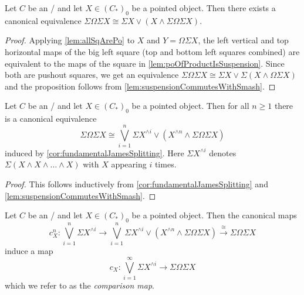 \begin{corollary}\label{cor:fundamentalJamesSplitting}
    Let $C$ be an \inftytop/ and let $X\in \left(C_*\right)_0$ be a pointed object. 
    Then there exists a canonical equivalence $\Sigma\Omega\Sigma X\cong\Sigma X\vee\left(X\wedge\Sigma\Omega\Sigma X\right)$.
    \begin{proof}
        Applying \cref{lem:allSqArePo} to $X$ and $Y=\Omega\Sigma X$, the left vertical and top horizontal maps of the big left square (top and bottom left squares combined) are equivalent to the maps of the square in \cref{lem:poOfProductIsSuspension}.
        Since both are pushout squares, we get an equivalence $\Sigma\Omega\Sigma X\cong\Sigma X\vee\Sigma\left(X\wedge\Omega\Sigma X\right)$ and the proposition follows from \cref{lem:suspensionCommutesWithSmash}.
    \end{proof}
\end{corollary}
\begin{corollary}
    Let $C$ be an \inftytop/ and let $X\in \left(C_*\right)_0$ be a pointed object. 
    Then for all $n\geq 1$ there is a canonical equivalence
    \begin{equation*}
        \Sigma\Omega\Sigma X \cong\bigvee\limits_{i=1}^n\Sigma X^{\wedge i}\vee\left(X^{\wedge n}\wedge\Sigma\Omega\Sigma X\right)
    \end{equation*}
    induced by \cref{cor:fundamentalJamesSplitting}.
    Here $\Sigma X^{\wedge i}$ denotes $\Sigma\left(X\wedge X\wedge\ldots\wedge X\right)$ with $X$ appearing $i$ times.
    \begin{proof}
        This follows inductively from \cref{cor:fundamentalJamesSplitting} and \cref{lem:suspensionCommutesWithSmash}.
    \end{proof}
\end{corollary}
\begin{definition}
    Let $C$ be an \inftytop/ and let $X\in \left(C_*\right)_0$ be a pointed object. 
    Then the canonical maps 
    \begin{equation*}
        c_X^n\colon\bigvee\limits_{i=1}^n\Sigma X^{\wedge i}\to\bigvee\limits_{i=1}^n\Sigma X^{\wedge i}\vee\left(X^{\wedge n}\wedge\Sigma\Omega\Sigma X\right)\xrightarrow{\cong}\Sigma\Omega\Sigma X
    \end{equation*}
    induce a map
    \begin{equation*}
        c_X\colon\bigvee\limits_{i=1}^{\infty}\Sigma X^{\wedge i}\to\Sigma\Omega\Sigma X
    \end{equation*}
    which we refer to as the \emph{comparison map}.
\end{definition}
